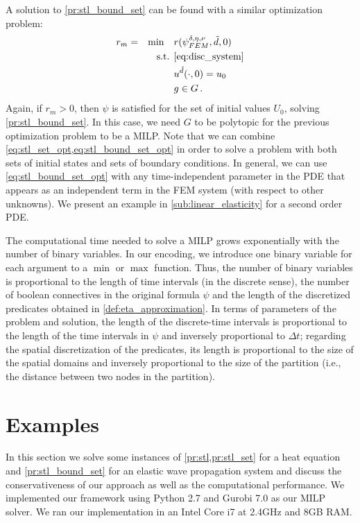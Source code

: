 \documentclass[letterpaper, 10 pt, conference]{ieeeconf/ieeeconf}
\begin{document}
A solution to \cref{pr:stl_bound_set} can be found with a similar optimization
problem:
%
\begin{equation}
    \label{eq:stl_bound_set_opt}
    \begin{aligned}
        &r_m = &\min \quad &r(\psi^{\delta, \eta, \nu}_{FEM}, \tilde{d}, 0) \\
        &  &\text{s.t. } &\cref{eq:disc_system} \\
        &  & &u^{\tilde{d}}(\cdot, 0) = u_0 \\
        &  & &g \in G \,.
    \end{aligned}
\end{equation}
%
Again, if $r_m > 0$, then $\psi$ is satisfied for the set of initial values
$U_0$, solving \cref{pr:stl_bound_set}. In this case, we need $G$ to be 
polytopic for the previous optimization problem
to be a MILP. Note that we can combine \cref{eq:stl_set_opt,eq:stl_bound_set_opt} in order to
solve a problem with both sets of initial states and sets of boundary
conditions. In general, we can use \cref{eq:stl_bound_set_opt} with any time-independent 
parameter in the PDE that appears
as an independent term in the FEM system (with respect to other unknowns). We
present an example in \cref{sub:linear_elasticity} for a second order PDE.

The computational time needed to solve a MILP grows exponentially with 
the number of binary variables. In our encoding, we introduce one
binary variable for each argument to a $\min$ or $\max$ function. Thus, the
number of binary variables is proportional to the length of time intervals (in
the discrete sense), the number of boolean connectives in the original formula
$\psi$ and the length of the discretized predicates obtained in
\cref{def:eta_approximation}. In terms of parameters of the problem and solution,
the length of the discrete-time intervals is proportional to the length of the time
intervals in $\psi$ and inversely proportional to $\Delta t$; regarding the
spatial discretization of the predicates, its length is proportional to the size
of the spatial domains and inversely proportional to the size of the partition
(i.e., the distance between two nodes in the partition).

\section{Examples}
\label{sec:examples}

In this section we solve some instances of \cref{pr:stl,pr:stl_set} for a heat
equation and \cref{pr:stl_bound_set} for an elastic wave propagation system and discuss
the conservativeness of our approach as well as the computational performance.
We implemented our framework using Python 2.7 and Gurobi 7.0 as our MILP solver.
We ran our implementation in an Intel Core i7 at 2.4GHz and 8GB RAM.
\end{document}
